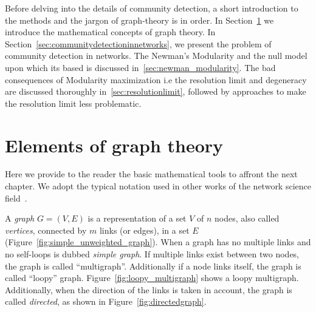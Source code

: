 Before delving into the details of community detection, a short introduction to the methods and the jargon of graph-theory is in order.
In Section~\ref{sec:elementsofgraphtheory} we introduce the mathematical concepts of graph theory. In Section~\ref{sec:communitydetectioninnetworks}, we present the problem of community detection in networks. The Newman's Modularity and the null model upon which its based is discussed in~\ref{sec:newman_modularity}. The bad consequences of Modularity maximization i.e the resolution limit and degeneracy are discussed thoroughly in~\ref{sec:resolutionlimit}, followed by approaches to make the resolution limit less problematic.

\section{Elements of graph theory}\label{sec:elementsofgraphtheory}
Here we provide to the reader the basic mathematical tools to affront the next chapter. We adopt the typical notation used in other works of the network science field~\cite{newman2010book,Estrada2011}.

A \emph{graph} $G=(V,E)$ is a representation of a set $V$ of $n$ nodes, also called \emph{vertices}, connected by $m$ links (or edges), in a set $E$ (Figure~\ref{fig:simple_unweighted_graph}). When a graph has no multiple links and no self-loops is dubbed \emph{simple graph}.
If multiple links exist between two nodes, the graph is called ``multigraph''. Additionally if a node links itself, the graph is called ``loopy'' graph. Figure~\ref{fig:loopy_multigraph} shows a loopy multigraph. Additionally, when the direction of the links is taken in account, the graph is called \emph{directed}, as shown in Figure~\ref{fig:directedgraph}.

